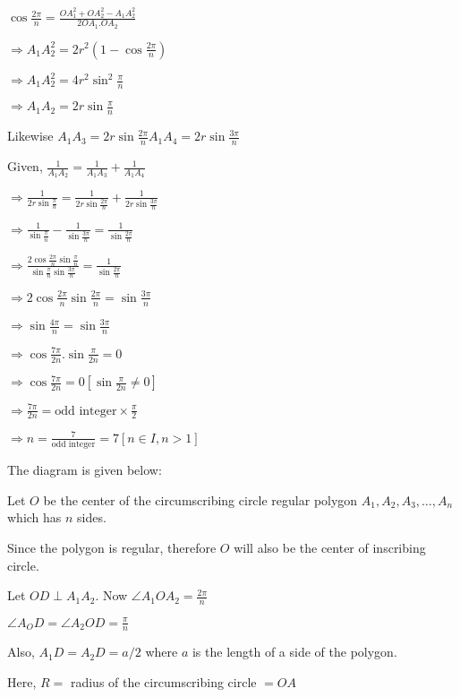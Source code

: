   $\cos\frac{2\pi}{n} = \frac{OA_1^2 + OA_2^2 - A_1A_2^2}{2OA_1.OA_2}$

  $\Rightarrow A_1A_2^2 = 2r^2\left(1 - \cos \frac{2\pi}{n}\right)$

  $\Rightarrow A_1A_2^2 = 4r^2\sin^2\frac{\pi}{n}$

  $\Rightarrow A_1A_2 = 2r\sin\frac{\pi}{n}$

  Likewise $A_1A_3 = 2r\sin\frac{2\pi}{n} A_1A_4 = 2r\sin\frac{3\pi}{n}$

  Given, $\frac{1}{A_1A_2} = \frac{1}{A_1A_3} + \frac{1}{A_1A_4}$

  $\Rightarrow \frac{1}{2r\sin\frac{\pi}{n}} = \frac{1}{2r\sin\frac{2\pi}{n}} + \frac{1}{2r\sin\frac{3\pi}{n}}$

  $\Rightarrow \frac{1}{\sin\frac{\pi}{n}} - \frac{1}{\sin\frac{3\pi}{n}} = \frac{1}{\sin\frac{2\pi}{n}}$

  $\Rightarrow \frac{2\cos\frac{2\pi}{n}\sin\frac{\pi}{n}}{\sin\frac{\pi}{n}\sin\frac{3\pi}{n}} = \frac{1}{\sin\frac{2\pi}{n}}$

  $\Rightarrow 2\cos\frac{2\pi}{n}\sin\frac{2\pi}{n} = \sin\frac{3\pi}{n}$

  $\Rightarrow \sin\frac{4\pi}{n} = \sin\frac{3\pi}{n}$

  $\Rightarrow \cos\frac{7\pi}{2n}.\sin\frac{\pi}{2n} = 0$

  $\Rightarrow \cos\frac{7\pi}{2n} = 0\left[\sin\frac{\pi}{2n} \neq 0\right]$

  $\Rightarrow \frac{7\pi}{2n} = \text{odd integer} \times \frac{\pi}{2}$

  $\Rightarrow n = \frac{7}{\text{odd integer}} = 7[n\in I, n > 1]$

\item The diagram is given below:

  \startplacefigure
    \externalfigure[21_14.pdf]
  \stopplacefigure

  Let $O$ be the center of the circumscribing circle regular polygon $A_1, A_2, A_3, \ldots, A_n$ which has $n$ sides.

  Since the polygon is regular, therefore $O$ will also be the center of inscribing circle.

  Let $OD\perp A_1A_2.$ Now $\angle A_1OA_2 = \frac{2\pi}{n}$

  $\angle A_OD = \angle A_2OD = \frac{\pi}{n}$

  Also, $A_1D = A_2D = a/2$ where $a$ is the length of a side of the polygon.

  Here, $R =$ radius of the circumscribing circle $= OA$

